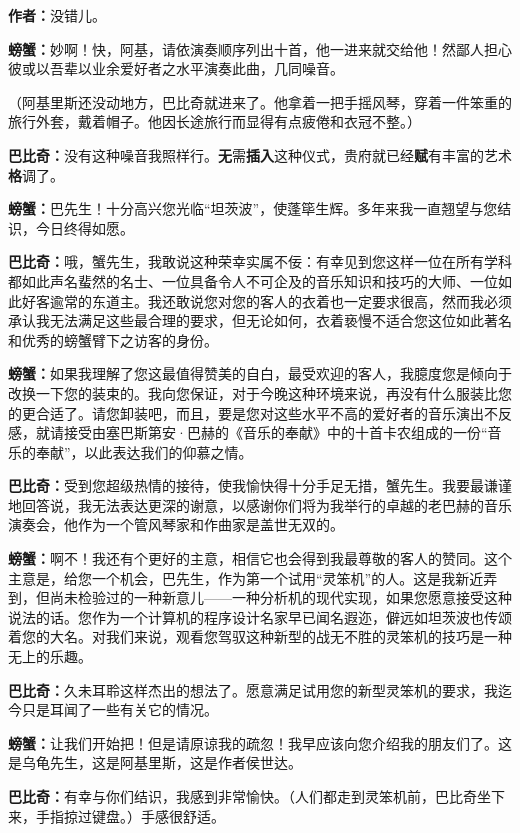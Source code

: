 \documentclass[
  12pt,
  twoside,
  openright,
  oldfontcommands,
]{memoir}
\newcommand{\kaitismall}[1]{{\kaitifamily\small #1}}
\newcommand{\heititext}[1]{{\sffamily\bfseries #1}}
\newcommand{\dialogname}[1]{{\sffamily\bfseries #1}}
\begin{document}
\dialogname{作者：}没错儿。

\dialogname{螃蟹：}妙啊！快，阿基，请依演奏顺序列出十首，他一进来就交给他！然鄙人担心彼或以吾辈以业余爱好者之水平演奏此曲，几同噪音。

（阿基里斯还没动地方，巴比奇就进来了。他拿着一把手摇风琴，穿着一件笨重的旅行外套，戴着帽子。他因长途旅行而显得有点疲倦和衣冠不整。）

\dialogname{巴比奇：}没有这种噪音我照样行。\heititext{无}需\heititext{插入}这种仪式，贵府就已经\heititext{赋}有丰富的艺术\heititext{格}调了。

\dialogname{螃蟹：}巴先生！十分高兴您光临``坦茨波''，使蓬筚生辉。多年来我一直翘望与您结识，今日终得如愿。

\dialogname{巴比奇：}哦，蟹先生，我敢说这种荣幸实属不佞：有幸见到您这样一位在所有学科都如此声名蜚然的名士、一位具备令人不可企及的音乐知识和技巧的大师、一位如此好客逾常的东道主。我还敢说您对您的客人的衣着也一定要求很高，然而我必须承认我无法满足这些最合理的要求，但无论如何，衣着亵慢不适合您这位如此著名和优秀的螃蟹臂下之访客的身份。

\dialogname{螃蟹：}如果我理解了您这最值得赞美的自白，最受欢迎的客人，我臆度您是倾向于改换一下您的装束的。我向您保证，对于今晚这种环境来说，再没有什么服装比您的更合适了。请您卸装吧，而且，要是您对这些水平不高的爱好者的音乐演出不反感，就请接受由塞巴斯第安·巴赫的《音乐的奉献》中的十首卡农组成的一份``音乐的奉献''，以此表达我们的仰慕之情。

\dialogname{巴比奇：}受到您超级热情的接待，使我愉快得十分手足无措，蟹先生。我要最谦谨地回答说，我无法表达更深的谢意，以感谢你们将为我举行的卓越的老巴赫的音乐演奏会，他作为一个管风琴家和作曲家是盖世无双的。

\dialogname{螃蟹：}啊不！我还有个更好的主意，相信它也会得到我最尊敬的客人的赞同。这个主意是，给您一个机会，巴先生，作为第一个试用``灵笨机''的人。这是我新近弄到，但尚未检验过的一种新意儿------一种分析机的现代实现，如果您愿意接受这种说法的话。您作为一个计算机的程序设计名家早已闻名遐迩，僻远如坦茨波也传颂着您的大名。对我们来说，观看您驾驭这种新型的战无不胜的灵笨机的技巧是一种无上的乐趣。

\dialogname{巴比奇：}久未耳聆这样杰出的想法了。愿意满足试用您的新型灵笨机的要求，我迄今只是耳闻了一些有关它的情况。

\dialogname{螃蟹：}让我们开始把！但是请原谅我的疏忽！我早应该向您介绍我的朋友们了。这是乌龟先生，这是阿基里斯，这是作者侯世达。

\dialogname{巴比奇：}有幸与你们结识，我感到非常愉快。\kaitismall{（人们都走到灵笨机前，巴比奇坐下来，手指掠过键盘。）}手感很舒适。
\end{document}
